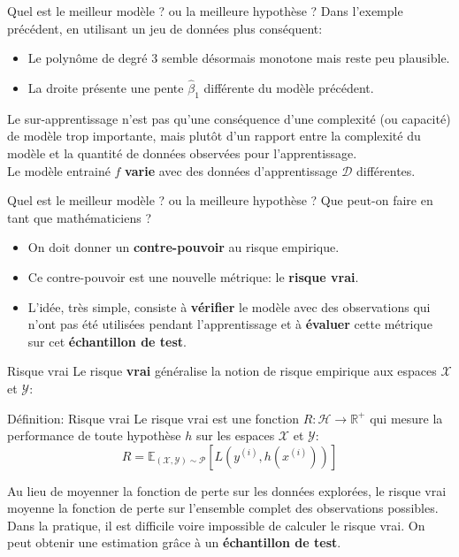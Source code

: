 \begin{frame}{Quel est le meilleur modèle ? ou la meilleure hypothèse ?}
	Dans l'exemple précédent, en utilisant un jeu de données plus conséquent:
	\begin{itemize}
		\item Le polynôme de degré 3 semble désormais monotone mais reste peu plausible.
		\item La droite présente une pente $\hat{\beta}_1$  différente du modèle précédent. 
	\end{itemize}
	\pause
	\vspace{0.5cm}
	Le sur-apprentissage n'est pas qu'une conséquence d'une complexité (ou capacité) de modèle trop importante, mais plutôt d'un rapport entre la complexité du modèle et la quantité de données observées pour l'apprentissage. \\
	\vspace{0.5cm}
	Le modèle entrainé $\hat{f}$ \textbf{varie} avec des données d'apprentissage $\mathcal{D}$ différentes.
	\pause
\end{frame}

\begin{frame}{Quel est le meilleur modèle ? ou la meilleure hypothèse ?}
	Que peut-on faire en tant que mathématiciens ?
	\begin{itemize}
		\item On doit donner un \textbf{contre-pouvoir} au risque empirique.
		\pause
		\item Ce contre-pouvoir est une nouvelle métrique: le \textbf{risque vrai}.
		\pause
		\item L'idée, très simple, consiste à \textbf{vérifier} le modèle avec des observations qui n'ont pas été utilisées pendant l'apprentissage et à \textbf{évaluer} cette métrique sur cet \textbf{échantillon de test}. 
	\end{itemize}
\end{frame}

\begin{frame}{Risque vrai}
	Le risque \textbf{vrai} généralise la notion de risque empirique aux espaces $\mathcal{X}$ et $\mathcal{Y}$:
	\begin{block}{Définition: Risque vrai}
		Le risque vrai est une fonction $R: \mathcal{H} \to \mathbb{R}^+$ qui mesure la performance de toute hypothèse $h$ sur les espaces $\mathcal{X}$ et $\mathcal{Y}$:
		\begin{equation}
			R = \mathbb{E}_{(\mathcal{X}, \mathcal{Y}) \sim \mathcal{P}}\left[L\left(y^{(i)}, h\left(x^{(i)}\right)\right)\right]
			\nonumber
		\end{equation}
		\hfill
	\end{block}
	\pause
	Au lieu de moyenner la fonction de perte sur les données explorées, le risque vrai moyenne la fonction de perte sur l'ensemble complet des observations possibles. \\
	\pause
	Dans la pratique, il est difficile voire impossible de calculer le risque vrai. On peut obtenir une estimation grâce à un \textbf{échantillon de test}.
\end{frame}

